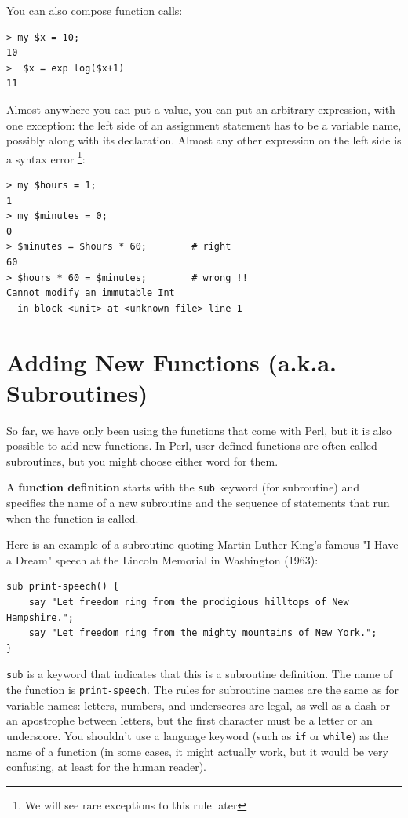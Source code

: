 You can also compose function calls:

\begin{verbatim}
> my $x = 10;
10
>  $x = exp log($x+1)
11
\end{verbatim}
%
Almost anywhere you can put a value, you can put an arbitrary
expression, with one exception: the left side of an assignment
statement has to be a variable name, possibly along with its
declaration.  Almost any other expression on the left
side is a syntax error \footnote{We will see rare exceptions to this rule
later}:

\begin{verbatim}
> my $hours = 1;
1
> my $minutes = 0;
0
> $minutes = $hours * 60;        # right 
60
> $hours * 60 = $minutes;        # wrong !!
Cannot modify an immutable Int
  in block <unit> at <unknown file> line 1
\end{verbatim}
%


\section{Adding New Functions (a.k.a. Subroutines)}

So far, we have only been using the functions that come with Perl,
but it is also possible to add new functions. In Perl, 
user-defined functions are often called subroutines, but you might choose 
either word for them. 

A {\bf function definition} starts with the {\tt sub} keyword (for
subroutine) and specifies the name of a new subroutine and
the sequence of statements that run when the function is called.

Here is an example of a subroutine quoting Martin Luther King's 
famous "I Have a Dream" speech at the Lincoln Memorial in 
Washington (1963):

\begin{verbatim}
sub print-speech() {
    say "Let freedom ring from the prodigious hilltops of New Hampshire.";
    say "Let freedom ring from the mighty mountains of New York.";
}
\end{verbatim}
%
{\tt sub} is a keyword that indicates that this is a subroutine
definition.  The name of the function is \verb"print-speech".  The
rules for subroutine names are the same as for variable names: letters,
numbers, and underscores are legal, as well as a dash or an 
apostrophe between letters, but the first character
must be a letter or an underscore.  You shouldn't use a 
language keyword (such as {\tt if} or {\tt while}) as 
the name of a function (in some cases, it might actually work, 
but it would be very confusing, at least for the human reader).

